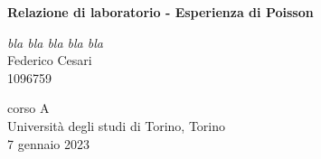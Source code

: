 \begin{titlepage}
   \begin{center}
       \vspace*{1cm}
        
       \textbf{\LARGE Relazione di laboratorio - Esperienza di Poisson}
       
       \vspace{0.3cm}
       \large \textit{bla bla bla bla bla} \\
       
       \vspace{0.5cm}
       \Large Federico Cesari \\
       
       \small 1096759

			
		\vspace{1cm}
		\begin{center}
			
		\end{center}
		
		

       \vfill
            
       
            
       \vspace{0.8cm}
     
       
            
       corso A\\
       Università degli studi di Torino, Torino\\
       7 gennaio 2023\\
       
            
   \end{center}
\end{titlepage}
